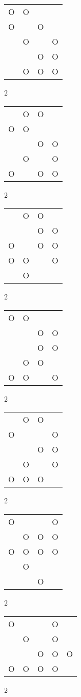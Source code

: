\begin{tabular}{|m{0.2cm}m{0.2cm}m{0.2cm}m{0.2cm}|}\hline
O&O& & \\
O& &O& \\
 &O& &O\\
 & &O&O\\
 &O&O&O\\
\hline\end{tabular}2
\begin{tabular}{|m{0.2cm}m{0.2cm}m{0.2cm}m{0.2cm}|}\hline
 &O&O& \\
O&O& & \\
 & &O&O\\
 &O& &O\\
O& &O&O\\
\hline\end{tabular}2
\begin{tabular}{|m{0.2cm}m{0.2cm}m{0.2cm}m{0.2cm}|}\hline
 &O&O& \\
 & &O&O\\
O& &O&O\\
O&O& &O\\
 &O& & \\
\hline\end{tabular}2
\begin{tabular}{|m{0.2cm}m{0.2cm}m{0.2cm}m{0.2cm}|}\hline
O&O& & \\
 & &O&O\\
 & &O&O\\
 &O&O& \\
O&O& &O\\
\hline\end{tabular}2
\begin{tabular}{|m{0.2cm}m{0.2cm}m{0.2cm}m{0.2cm}|}\hline
 &O&O& \\
O& & &O\\
 & &O&O\\
 &O& &O\\
O&O&O& \\
\hline\end{tabular}2
\begin{tabular}{|m{0.2cm}m{0.2cm}m{0.2cm}m{0.2cm}|}\hline
O& & &O\\
 &O&O&O\\
O&O&O&O\\
 &O& & \\
 & &O& \\
\hline\end{tabular}2
\begin{tabular}{|m{0.2cm}m{0.2cm}m{0.2cm}m{0.2cm}m{0.2cm}|}\hline
O& & &O& \\
 &O& &O& \\
 & &O&O&O\\
O&O&O&O& \\
\hline\end{tabular}2

